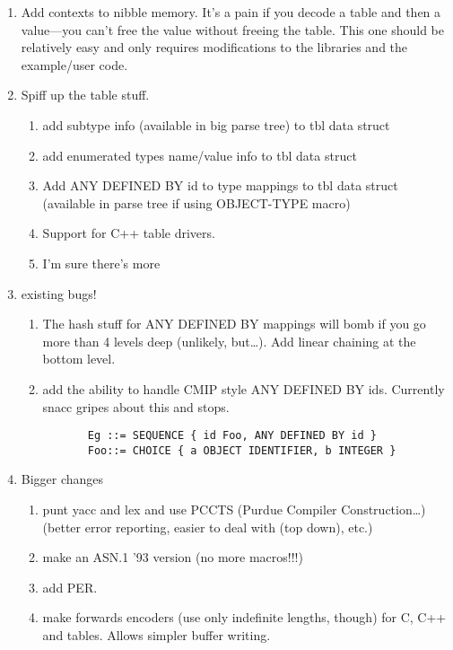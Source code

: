 \begin{enumerate}

  \item {Add contexts to nibble memory.  It's a pain if you decode
    a table and then a value---you can't free the value without freeing
    the table.  This one should be relatively easy and only requires
    modifications to the libraries and the example/user code.}

  \item Spiff up the table stuff.
    \begin{enumerate}
      \item {add subtype info (available in big parse tree) to tbl data struct}
      \item {add enumerated types name/value info to tbl data struct}
      \item {Add ANY DEFINED BY id to type mappings to tbl data struct (available in parse tree if using OBJECT-TYPE macro)}
      \item {Support for C++ table drivers.}
      \item {I'm sure there's more}
    \end{enumerate}

  \item {existing bugs!}
    \begin{enumerate}
      \item {The hash stuff for ANY DEFINED BY mappings will bomb if you go more than 4 levels deep (unlikely, but\dots). Add linear chaining at the bottom level.}
      \item {add the ability to handle CMIP style ANY DEFINED BY ids.  Currently snacc gripes about this and stops.}
	\begin{verbatim}
	   Eg ::= SEQUENCE { id Foo, ANY DEFINED BY id }
	   Foo::= CHOICE { a OBJECT IDENTIFIER, b INTEGER }
	\end{verbatim}
    \end{enumerate}

  \item {Bigger changes}
    \begin{enumerate}
      \item {punt yacc and lex and use PCCTS (Purdue Compiler Construction\dots) (better error reporting, easier to deal with (top down), etc.)}
      \item {make an ASN.1 '93 version (no more macros!!!)}
      \item {add PER.}
      \item {make forwards encoders (use only indefinite lengths, though) for C, C++ and tables.  Allows simpler buffer writing.}
    \end{enumerate}

\end{enumerate}
